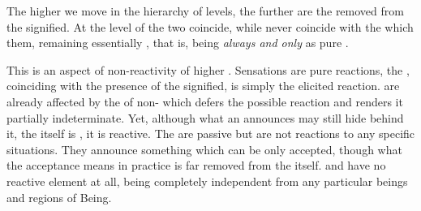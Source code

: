 \pa The higher we move in the hierarchy of levels, the further are the 
 removed from the signified.  At the level of 
the two coincide, while  never coincide with the
 which  them, remaining essentially
, that is, being  {\em always and only} as
 pure .
%

\label{nonreactive}
This is an aspect of non-reactivity of  higher .
Sensations are pure reactions, the , coinciding with the presence of the
signified, is simply the elicited reaction.   
are already affected by the  of non- which 
defers the possible reaction and renders it partially
indeterminate. Yet, although what an 
announces may still hide behind it, the  itself is ,
it is reactive.
The  are passive but are not reactions 
to any specific situations. They announce something which can be only accepted,
though what the acceptance means in practice is far removed from the
 itself.  and  have 
no reactive element at all, being completely independent from 
any particular beings and regions of Being. 

